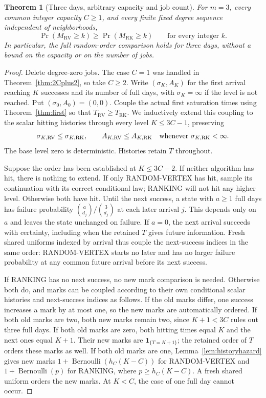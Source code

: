 \documentclass[11pt]{article}
\newtheorem{theorem}{Theorem}
\newcommand{\RV}{\mathrm{RV}}
\newcommand{\RK}{\mathrm{RK}}
\begin{document}
\begin{theorem}[Three days, arbitrary capacity and job count]\label{thm:three}
For $m=3$, every common integer capacity $C\geq1$, and every finite
fixed degree sequence independent of neighborhoods,
\[
 \Pr(M_\RV\geq k)\geq\Pr(M_\RK\geq k)
 \qquad\text{for every integer }k.
\]
In particular, the full random-order comparison holds for three days,
without a bound on the capacity or on the number of jobs.
\end{theorem}
\begin{proof}
Delete degree-zero jobs. The case $C=1$ was handled in
Theorem~\ref{thm:2Cplus2}, so take $C\geq2$.
Write $(\sigma_K,A_K)$ for the first arrival reaching $K$ successes
and its number of full days, with $\sigma_K=\infty$ if the level is
not reached. Put $(\sigma_0,A_0)=(0,0)$.
Couple the actual first saturation times using Theorem~\ref{thm:first}
so that $T_\RV\geq T_\RK$. We inductively extend this coupling to the
scalar hitting histories through every level $K\leq3C-1$, preserving
\[
 \sigma_{K,\RV}\leq\sigma_{K,\RK},\qquad
 A_{K,\RV}\leq A_{K,\RK}
 \quad\hbox{whenever }\sigma_{K,\RK}<\infty.
\]
The base level zero is deterministic. Histories retain $T$ throughout.

Suppose the order has been established at $K\leq3C-2$. If neither
algorithm has hit, there is nothing to extend. If only RANDOM-VERTEX
has hit, sample its continuation with its correct conditional law;
RANKING will not hit any higher level. Otherwise both have hit.
Until the next success, a state with $a\geq1$ full days has failure
probability $\binom a{d_j}/\binom3{d_j}$ at each later arrival $j$.
This depends only on $a$ and leaves the state unchanged on failure.
If $a=0$, the next arrival succeeds with certainty, including when
the retained $T$ gives future information. Fresh shared uniforms indexed
by arrival thus couple the next-success indices in the same order:
RANDOM-VERTEX starts no later and has no larger failure probability
at any common future arrival before its next success.

If RANKING has no next success, no new mark comparison is needed.
Otherwise both do, and marks can be coupled according to their own
conditional scalar histories and next-success indices as follows.
If the old marks differ, one success increases a mark by at most one,
so the new marks are automatically ordered. If both old marks are two,
both new marks remain two, since $K+1<3C$ rules out three full days.
If both old marks are zero, both hitting times equal $K$ and the next
ones equal $K+1$. Their new marks are $\mathbf1_{\{T=K+1\}}$;
the retained order of $T$ orders these marks as well.
If both old marks are one, Lemma~\ref{lem:historyhazard} gives new
marks $1+\operatorname{Bernoulli}(h_C(K-C))$ for RANDOM-VERTEX and
$1+\operatorname{Bernoulli}(p)$ for RANKING, where
$p\geq h_C(K-C)$. A fresh shared uniform orders the new marks.
At $K<C$, the case of one full day cannot occur.


\end{proof}
\end{document}
